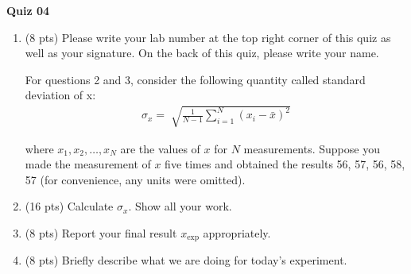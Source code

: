 \documentclass[letterpaper, 11pt]{article}
\begin{document}
\begin{center}
\textbf{\large Quiz 04}
\end{center}
\begin{enumerate}
	\item (8 pts) Please write your lab number at the top right corner of this quiz as well as your signature. On the back of this quiz, please write your name.\vspace{0.25cm}

For questions 2 and 3, consider the following quantity called standard deviation of x:
	\begin{align}
			\sigma_{x} = \sqrt[]{\frac{1}{N - 1} \sum_{i = 1}^{N} (x_{i} - \bar{x})^{2}}
	\end{align}
	
where \(x_{1}, x_{2}, \dots, x_{N}\) are the values of \(x\) for \(N\) measurements. Suppose you made the measurement of \(x\) five times and obtained the results 56, 57, 56, 58, 57 (for convenience, any units were omitted).

	\item (16 pts) Calculate \(\sigma_{x}\). Show all your work. 
	\vspace{8cm}
	
	\item (8 pts) Report your final result \(x_{\text{exp}}\) appropriately. 
	\vspace{3cm}
	
	\item (8 pts) Briefly describe what we are doing for today's experiment.   
\end{enumerate}
\end{document}
